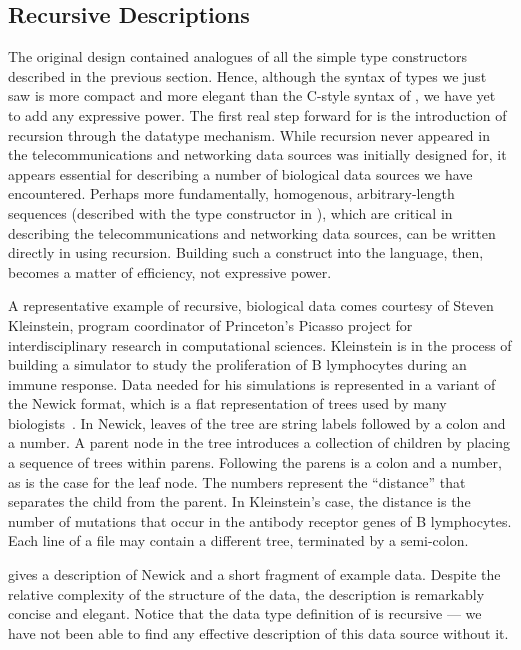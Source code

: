 \subsection{Recursive Descriptions}

The original \pads{} design contained analogues of all the simple type
constructors described in the previous section.  Hence, although the
syntax of types we just saw is more compact and more elegant than the
C-style syntax of \pads, we have yet to add any expressive power.  The
first real step forward for \padsml{} is the introduction of recursion
through the datatype mechanism.  While recursion never appeared in the
telecommunications and networking data sources \pads{} was initially
designed for, it appears essential for describing a number of
biological data sources we have encountered. Perhaps more
fundamentally, homogenous, arbitrary-length sequences (described with
the  type constructor in \pads{}), which are critical in
describing the telecommunications and networking data sources, can be
written directly in \padsml{} using recursion. Building such a
construct into the language, then, becomes a matter of efficiency, not
expressive power.
  
A representative example of recursive, biological data comes courtesy
of Steven Kleinstein, program coordinator of Princeton's Picasso
project for interdisciplinary research in computational sciences.
Kleinstein is in the process of building a simulator to study the
proliferation of B lymphocytes during an immune response.  Data needed
for his simulations is represented in a variant of the Newick format,
which is a flat representation of trees used by many
biologists~\cite{newick}.  In Newick, leaves of the tree are string
labels followed by a colon and a number.  A parent node in the tree
introduces a collection of children by placing a sequence of trees
within parens.  Following the parens is a colon and a number, as is
the case for the leaf node.  The numbers represent the ``distance''
that separates the child from the parent.  In Kleinstein's case, the
distance is the number of mutations that occur in the antibody
receptor genes of B lymphocytes.  Each line of a file may contain a
different tree, terminated by a semi-colon.

 gives a description of Newick and a short fragment 
of example data.  Despite the relative complexity of the structure of the data,
the description is remarkably concise and elegant.  Notice that the data type
definition of  is recursive --- we have not been able to find any
effective description of this data source without it.

